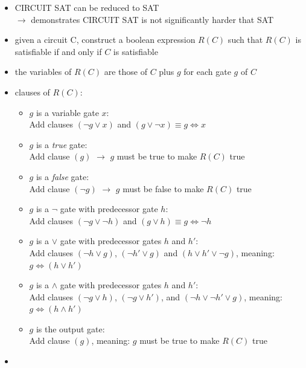 \documentclass[a4]{scrartcl}
\begin{document}
\begin{itemize}
\item CIRCUIT SAT can be reduced to SAT \\
$\rightarrow$ demonstrates CIRCUIT SAT is not significantly harder that SAT
\item 
given a circuit C, construct a boolean expression $R(C)$ such that $R(C)$ is satisfiable if and only if $C$ is satisfiable
\item the variables of $R(C)$ are those of $C$ plus $g$ for each gate $g$ of $C$
\item clauses of $R(C)$:
\begin{itemize}
\item $g$ is a variable gate $x$: \\
Add clauses $(\lnot g \vee x)$ and $(g \vee \lnot x) \equiv g \Leftrightarrow x$
\item $g$ is a \textit{true} gate: \\
Add clause $(g)$ $\rightarrow$ $g$ must be true to make $R(C)$ true
\item $g$ is a \textit{false} gate: \\
Add clause $(\lnot g)$ $\rightarrow$ $g$ must be false to make $R(C)$ true
\item $g$ is a $\lnot$ gate with predecessor gate $h$: \\
Add clauses $(\lnot g \vee \lnot h)$ and $(g \vee h) \equiv g \Leftrightarrow \lnot h$ \\
\item $g$ is a $\vee$ gate with predecessor gates $h$ and $h'$: \\
Add clauses $(\lnot h \vee g)$, $(\lnot h' \vee g)$ and $(h \vee h' \vee \lnot g)$, meaning: $g \Leftrightarrow (h \vee h')$
\item $g$ is a $\wedge$ gate with predecessor gates $h$ and $h'$: \\
Add clauses $(\lnot g \vee h)$, $(\lnot g \vee h')$, and $(\lnot h \vee \lnot h' \vee g)$, meaning: $g \Leftrightarrow (h \wedge h')$
\item $g$ is the output gate: \\
Add clause $(g)$, meaning: $g$ must be true to make $R(C)$ true
\end{itemize}
\item[] \cite{RCV}
\end{itemize}
\end{document}
